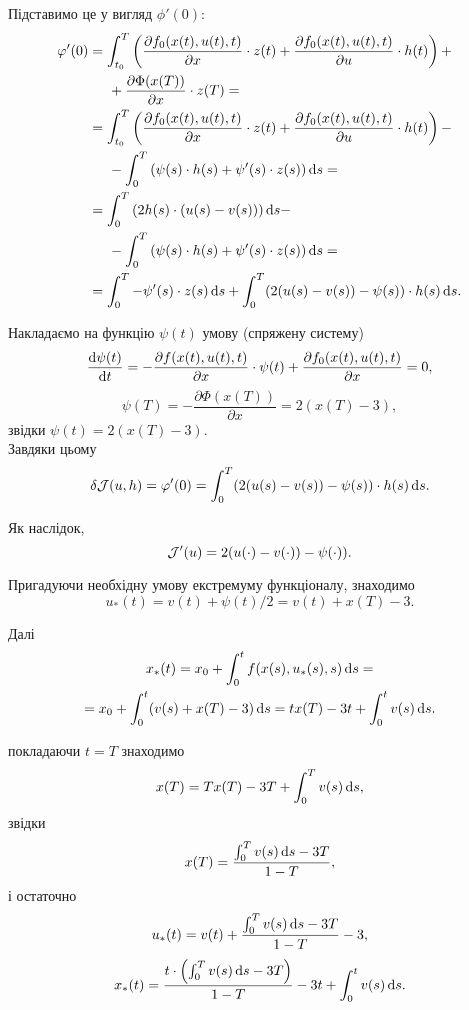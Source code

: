 \begin{solution}
	Підставимо це у вигляд $\phi' (0)$:
	\begin{align*}
		\varphi' (0) &= \int_{t_0}^T \left( \frac{\partial f_0 (x (t), u (t), t)}{\partial x} \cdot z(t) + \frac{\partial f_0 (x (t), u (t), t)}{\partial u} \cdot h(t) \right) + \\
		& \left.\right. \quad + \frac{\partial \Phi (x (T))}{ \partial x} \cdot z (T) = \\
		&= \int_{t_0}^T \left( \frac{\partial f_0 (x (t), u (t), t)}{\partial x} \cdot z(t) + \frac{\partial f_0 (x (t), u (t), t)}{\partial u} \cdot h(t) \right) - \\
		& \left.\right. \quad - \int_0^T \left( \psi (s) \cdot h (s) + \psi' (s) \cdot z (s) \right) \mathop{}\!\mathrm{d} s = \\
		&= \int_0^T \left( 2 h (s) \cdot (u(s) - v (s)) \right) \mathop{}\!\mathrm{d} s - \\
		& \left.\right. \quad - \int_0^T \left( \psi (s) \cdot h (s) + \psi' (s) \cdot z (s) \right) \mathop{}\!\mathrm{d} s = \\
		&= \int_0^T - \psi'(s) \cdot z(s) \mathop{}\!\mathrm{d} s + \int_0^T (2 (u(s) - v(s)) - \psi(s)) \cdot h(s) \mathop{}\!\mathrm{d} s.
	\end{align*}

	Накладаємо на функцію $\psi(t)$ умову (спряжену систему) \[ \frac{\mathop{}\!\mathrm{d} \psi (t)}{\mathop{}\!\mathrm{d} t} = - \frac{\partial f (x (t), u (t), t)}{\partial x} \cdot \psi (t) + \frac{\partial f_0 (x (t), u (t), t)}{\partial x} = 0, \] \[ \psi(T) = - \frac{\partial \Phi( x (T))}{\partial x} = 2 (x (T) - 3), \] звідки $\psi (t) = 2 (x (T) - 3)$. \\

	Завдяки цьому \[ \delta \mathcal{J} (u, h) = \varphi' (0) = \int_0^T (2 (u(s) - v(s)) - \psi(s)) \cdot h(s) \mathop{}\!\mathrm{d} s. \]

	Як наслідок, \[ \mathcal{J} ' (u) = 2 (u (\cdot) - v (\cdot)) - \psi(\cdot)). \]

	Пригадуючи необхідну умову екстремуму функціоналу, знаходимо \[ u_* (t) = v (t) + \psi (t) / 2 = v (t) + x (T) - 3. \]

	Далі \begin{multline*} 
		x_*(t) = x_0 + \int_0^t f(x(s), u_*(s), s) \mathop{}\!\mathrm{d} s = \\
		= x_0 + \int_0^t (v(s) + x(T) - 3) \mathop{}\!\mathrm{d} s = t x (T) - 3 t + \int_0^t v(s) \mathop{}\!\mathrm{d} s.
	\end{multline*}

	покладаючи $t = T$ знаходимо \[ x (T) = T x (T) - 3 T + \int_0^T v(s) \mathop{}\!\mathrm{d} s, \] звідки \[ x(T) = \frac{\int_0^T v(s) \mathop{}\!\mathrm{d} s - 3  T}{1 - T}, \] і остаточно \[ u_* (t) = v (t) + \frac{\int_0^T v(s) \mathop{}\!\mathrm{d} s - 3  T}{1 - T} - 3, \] \[ x_* (t) =  \frac{t \cdot \left(\int_0^T v(s) \mathop{}\!\mathrm{d} s - 3  T\right)}{1 - T} - 3 t + \int_0^t v(s) \mathop{}\!\mathrm{d} s .\]
\end{solution}

